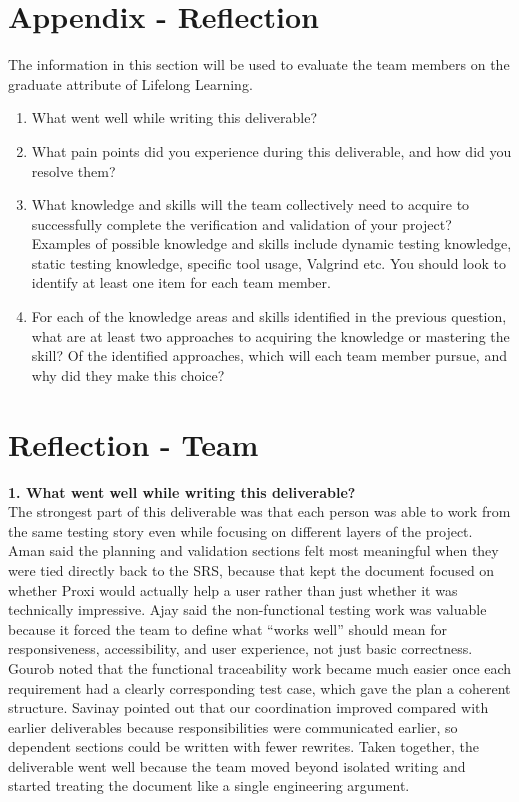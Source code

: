 \documentclass[12pt, titlepage]{article}
\begin{document}
\newpage
\section*{Appendix - Reflection}


The information in this section will be used to evaluate the team members on
the graduate attribute of Lifelong Learning.



\begin{enumerate}
  \item What went well while writing this deliverable?
  \item What pain points did you experience during this deliverable, and how
    did you resolve them?
  \item What knowledge and skills will the team collectively need to acquire
  to successfully complete the verification and validation of your project?
  Examples of possible knowledge and skills include dynamic testing
  knowledge, static testing knowledge, specific tool usage, Valgrind etc.
  You should look to identify at least one item for each team member.
  \item For each of the knowledge areas and skills identified in the
  previous question, what are at least two approaches to acquiring the
  knowledge or mastering the skill? Of the identified approaches, which
  will each team member pursue, and why did they make this choice?
\end{enumerate}

\newpage
\section*{Reflection - Team}

\textbf{1. What went well while writing this deliverable?}\\
The strongest part of this deliverable was that each person was able to work
from the same testing story even while focusing on different layers of the
project. Aman said the planning and validation sections felt most meaningful
when they were tied directly back to the SRS, because that kept the document
focused on whether Proxi would actually help a user rather than just whether
it was technically impressive. Ajay said the non-functional testing work was
valuable because it forced the team to define what ``works well'' should mean
for responsiveness, accessibility, and user experience, not just basic
correctness. Gourob noted that the functional traceability work became much
easier once each requirement had a clearly corresponding test case, which
gave the plan a coherent structure. Savinay pointed out that our coordination
improved compared with earlier deliverables because responsibilities were
communicated earlier, so dependent sections could be written with fewer
rewrites. Taken together, the deliverable went well because the team moved
beyond isolated writing and started treating the document like a single
engineering argument.
\end{document}
